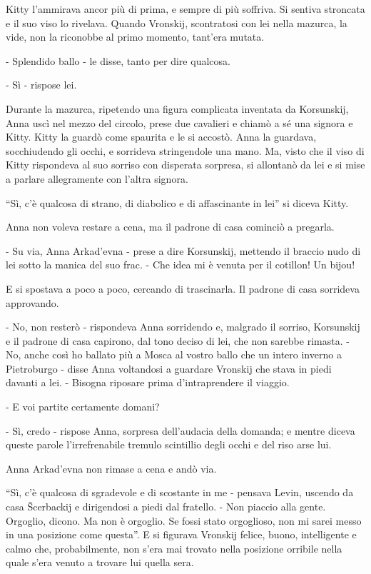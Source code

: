 Kitty l'ammirava ancor più di prima, e sempre di più soffriva. Si sentiva stroncata e il suo viso lo rivelava. Quando Vronskij, scontratosi con lei nella mazurca, la vide, non la riconobbe al primo momento, tant'era mutata. 

- Splendido ballo - le disse, tanto per dire qualcosa. 

- Sì - rispose lei. 

Durante la mazurca, ripetendo una figura complicata inventata da Korsunskij, Anna uscì nel mezzo del circolo, prese due cavalieri e chiamò a sé una signora e Kitty. Kitty la guardò come spaurita e le si accostò. Anna la guardava, socchiudendo gli occhi, e sorrideva stringendole una mano. Ma, visto che il viso di Kitty rispondeva al suo sorriso con disperata sorpresa, si allontanò da lei e si mise a parlare allegramente con l'altra signora. 

``Sì, c'è qualcosa di strano, di diabolico e di affascinante in lei'' si diceva Kitty. 

Anna non voleva restare a cena, ma il padrone di casa cominciò a pregarla. 

- Su via, Anna Arkad'evna - prese a dire Korsunskij, mettendo il braccio nudo di lei sotto la manica del suo frac. - Che idea mi è venuta per il cotillon! Un bijou! 

E si spostava a poco a poco, cercando di trascinarla. Il padrone di casa sorrideva approvando. 

- No, non resterò - rispondeva Anna sorridendo e, malgrado il sorriso, Korsunskij e il padrone di casa capirono, dal tono deciso di lei, che non sarebbe rimasta. - No, anche così ho ballato più a Mosca al vostro ballo che un intero inverno a Pietroburgo - disse Anna voltandosi a guardare Vronskij che stava in piedi davanti a lei. - Bisogna riposare prima d'intraprendere il viaggio. 

- E voi partite certamente domani? 

- Sì, credo - rispose Anna, sorpresa dell'audacia della domanda; e mentre diceva queste parole l'irrefrenabile tremulo scintillio degli occhi e del riso arse lui. 

Anna Arkad'evna non rimase a cena e andò via. 

``Sì, c'è qualcosa di sgradevole e di scostante in me - pensava Levin, uscendo da casa Šcerbackij e dirigendosi a piedi dal fratello. - Non piaccio alla gente. Orgoglio, dicono. Ma non è orgoglio. Se fossi stato orgoglioso, non mi sarei messo in una posizione come questa''. E si figurava Vronskij felice, buono, intelligente e calmo che, probabilmente, non s'era mai trovato nella posizione orribile nella quale s'era venuto a trovare lui quella sera. 


